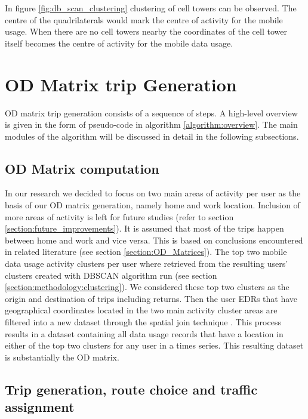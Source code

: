 \documentclass[12pt, a4paper]{report}
\theoremstyle{definition}
\theoremstyle{definition}%
\theoremstyle{definition}%
\theoremstyle{definition}%
\theoremstyle{definition}%
\theoremstyle{definition}%
\begin{document}
In figure \ref{fig:db_scan_clustering} clustering of cell towers can be observed. The centre of the quadrilaterals would mark the centre of activity for the mobile usage. When there are no cell towers nearby the coordinates of the cell tower itself becomes the centre of activity for the mobile data usage. 



\section{OD Matrix trip Generation}  \label{section:odmatrix_trip_generation}

OD matrix trip generation consists of a sequence of steps. A high-level overview is given in the form of pseudo-code in algorithm \ref{algorithm:overview}. The main modules of the algorithm will be discussed in detail in the following subsections.
 
\subsection{OD Matrix computation}   \label{subsection:odmatrix_computation}
In our research we decided to focus on two main areas of activity per user as the basis of our OD matrix generation, namely home and work location. Inclusion of more areas of activity is left for future studies (refer to section \ref{section:future_improvements}). It is assumed that most of the trips happen between home and work and vice versa. This is based on conclusions encountered in related literature (see section \ref{section:OD_Matrices}). 
The top two mobile data usage activity clusters per user where retrieved from the resulting users' clusters created with DBSCAN algorithm run (see section \ref{section:methodology:clustering}). We considered these top two clusters as the origin and destination of trips including returns. Then the user EDRs that have geographical coordinates located in the two main activity cluster areas are filtered into a new dataset through the spatial join technique \cite{eldawy2015spatialhadoop}. This process results in a dataset containing all data usage records that have a location in either of the top two clusters for any user in a times series. This resulting dataset is substantially the OD matrix.


\subsection{Trip generation, route choice and traffic assignment} \label{subsection:trip_generation}
\end{document}
